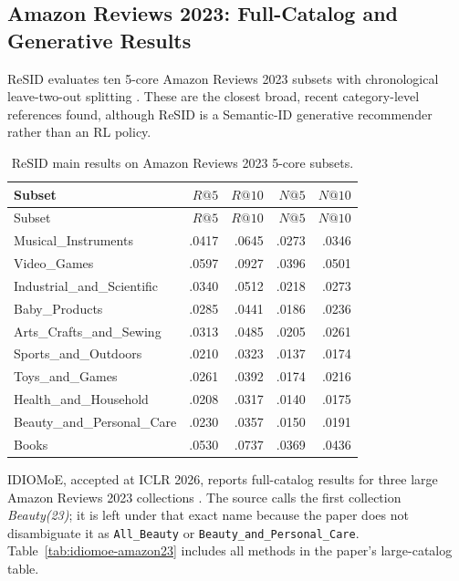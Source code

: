 \subsection{Amazon Reviews 2023: Full-Catalog and Generative Results}

ReSID evaluates ten 5-core Amazon Reviews 2023 subsets with chronological
leave-two-out splitting \cite{RESID}. These are the closest broad, recent
category-level references found, although ReSID is a Semantic-ID generative
recommender rather than an RL policy.

\begin{longtable}{@{}p{}rrrr@{}}
\caption{ReSID main results on Amazon Reviews 2023 5-core subsets.}
\label{tab:resid-amazon23}\\
\toprule
Subset & $R@5$ & $R@10$ & $N@5$ & $N@10$ \\
\midrule
\endfirsthead
\toprule
Subset & $R@5$ & $R@10$ & $N@5$ & $N@10$ \\
\midrule
\endhead
Musical\_Instruments & .0417 & .0645 & .0273 & .0346 \\
Video\_Games & .0597 & .0927 & .0396 & .0501 \\
Industrial\_and\_Scientific & .0340 & .0512 & .0218 & .0273 \\
Baby\_Products & .0285 & .0441 & .0186 & .0236 \\
Arts\_Crafts\_and\_Sewing & .0313 & .0485 & .0205 & .0261 \\
Sports\_and\_Outdoors & .0210 & .0323 & .0137 & .0174 \\
Toys\_and\_Games & .0261 & .0392 & .0174 & .0216 \\
Health\_and\_Household & .0208 & .0317 & .0140 & .0175 \\
Beauty\_and\_Personal\_Care & .0230 & .0357 & .0150 & .0191 \\
Books & .0530 & .0737 & .0369 & .0436 \\
\bottomrule
\end{longtable}

IDIOMoE, accepted at ICLR 2026, reports full-catalog results for three large
Amazon Reviews 2023 collections \cite{IDIOMOE}. The source calls the first
collection \emph{Beauty(23)}; it is left under that exact name because the
paper does not disambiguate it as \texttt{All\_Beauty} or
\texttt{Beauty\_and\_Personal\_Care}. Table~\ref{tab:idiomoe-amazon23}
includes all methods in the paper's large-catalog table.

